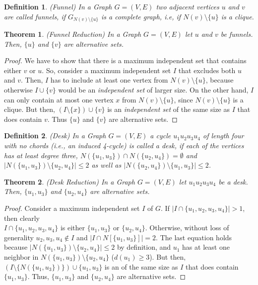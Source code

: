 \documentclass[]{article}
\newtheorem{theorem}{Theorem}
\newtheorem{definition}{Definition}
\begin{document}
\begin{definition} (Funnel)
	In a Graph $G=(V,E)$ two adjacent vertices $u$ and $v$ are called funnels, if $G_{N(v)\setminus\{u\}}$ is a complete graph, i.e, if $N(v)\setminus\{u\}$ is a clique.
\end{definition}
\begin{theorem} (Funnel Reduction) In a Graph $G=(V,E)$ let $u$ and $v$ be funnels. Then, $\{u\}$ and $\{v\}$ are alternative sets.	
\end{theorem}
\begin{proof}
	We have to show that there is a maximum independent set that contains either $v$ or $u$. So, consider a maximum independent set $I$ that excludes both $u$ and $v$. Then, $I$ has to include at least one vertex from $N(v)\setminus\{u\}$, because otherwise $I\cup\{v\}$ would be an \textit{independent set} of larger size. On the other hand, $I$ can only contain at most one vertex $x$ from $N(v)\setminus\{u\}$, since $N(v)\setminus\{u\}$ is a clique. But then, $(I\setminus\{x\})\cup\{v\}$ is an \textit{independent set} of the same size as $I$ that does contain $v$. Thus $\{u\}$ and $\{v\}$ are alternative sets.
\end{proof}

\begin{definition} (Desk)
	In a Graph $G=(V,E)$ a cycle $u_1u_2u_3u_4$ of length four with no chords (i.e., an induced 4-cycle) is called a desk, if each of the vertices has at least degree three, $N(\{u_1, u_3\})\cap N(\{u_2, u_4\}) = \emptyset$ and $|N(\{u_1, u_3\})\setminus \{u_2, u_4\}|\leq 2$ as well as $|N(\{u_2, u_4\})\setminus \{u_1, u_3\}|\leq 2$.
\end{definition}
\begin{theorem}(Desk Reduction) 
	In a Graph $G=(V,E)$ let $u_1u_2u_3u_4$ be a desk. Then, $\{u_1, u_3\}$ and $\{u_2, u_4\}$ are alternative sets.	
\end{theorem}
\begin{proof}
	Consider a maximum independent set $I$ of $G$. If $|I\cap \{u_1,u_2,u_3,u_4\}| > 1$, then clearly\\ $I\cap \{u_1,u_2,u_3,u_4\} $ is either $\{u_1, u_3\}$ or $\{u_2, u_4\}$. Otherwise, without loss of generality $u_2,u_3,u_4\notin I$ and $|I\cap N[\{u_1,u_3\}]|=2$. The last equation holds because $|N(\{u_1, u_3\})\setminus\{u_2,u_4\}| \leq 2$ by definition, and $u_1$ has at least one neighbor in $N(\{u_1, u_3\})\setminus\{u_2,u_4\}$ ($d(u_1)\geq3$). But then, $(I\setminus\{N(\{u_1,u_3\})\})\cup\{u_1,u_3\}$ is an  of the same size as $I$ that does contain $\{u_1, u_3\}$. Thus, $\{u_1,u_3\}$ and $\{u_2, u_4\}$ are alternative sets.
\end{proof}
\end{document}
